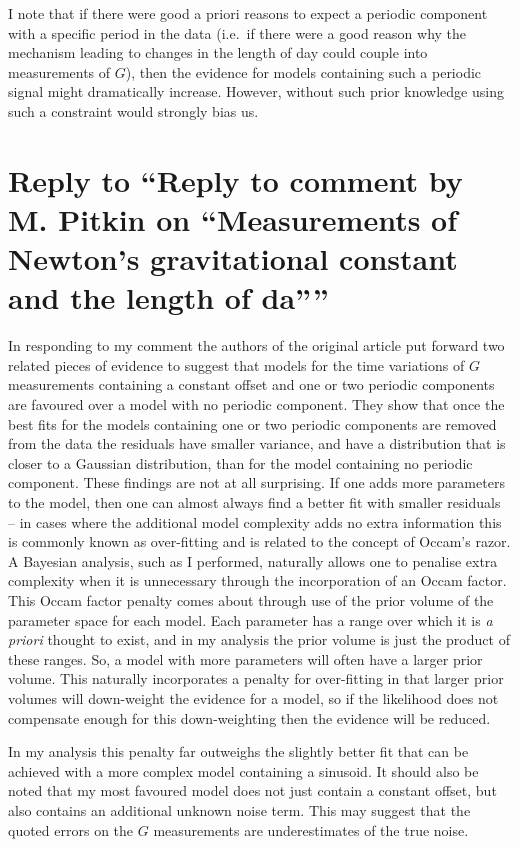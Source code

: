 \documentclass[doublecol]{epl2}
\begin{document}
I note that if there were good a priori reasons to expect a periodic component with a specific period in the data
(i.e.\ if there were a good reason why the mechanism leading to changes in the length of day could couple into 
measurements of
$G$), then the evidence for models containing such a periodic signal might dramatically increase. However, without such
prior knowledge using such a constraint would strongly bias us.

\section{Reply to ``Reply to comment by M. Pitkin on ``Measurements of Newton's 
gravitational constant and the length of da''''}

In responding to my comment the authors of the original article put forward two related pieces of 
evidence to suggest that models for the time variations of $G$ measurements containing a constant 
offset and one or two periodic components are favoured over a model with no periodic component. 
They show that once the best fits for the models containing one or two periodic components are 
removed from the data the residuals have smaller variance, and have a distribution that is closer 
to a Gaussian distribution, than for the model containing no periodic component. These findings are 
not at all surprising.  If one adds more parameters to the model, then one can almost always find a 
better fit with smaller residuals -- in cases where the additional model complexity adds no extra 
information this is commonly known as over-fitting and is related to the concept of Occam's razor. 
A Bayesian analysis, such as I performed, naturally allows one to penalise extra complexity when it 
is unnecessary through the incorporation of an Occam factor. This Occam factor penalty comes 
about through use of the prior volume of the parameter space for each model. Each parameter has a 
range over which it is {\it a priori} thought to exist, and in my analysis the prior volume is 
just the product of these ranges. So, a model with more parameters will often have a larger prior 
volume. This naturally incorporates a penalty for over-fitting in that larger prior volumes will 
down-weight the evidence for a model, so if the likelihood does not compensate enough for this 
down-weighting then the evidence will be reduced.

In my analysis this penalty far outweighs the slightly better fit that can be achieved with a more 
complex model containing a sinusoid. It should also be noted that my most favoured model does not 
just contain a constant offset, but also contains an additional unknown noise term. This may 
suggest that the quoted errors on the $G$ measurements are underestimates of the true noise.
\end{document}
